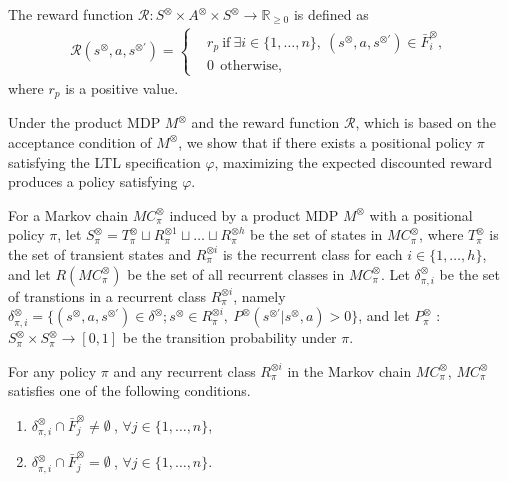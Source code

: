 \documentclass[a4j,12pt,oneside,openany,english,dvipdfmx]{jsbook}
\begin{document}
\begin{definition}
  The reward function $\mathcal{R} :S^{\otimes} \times A^{\otimes} \times S^{\otimes} \rightarrow {\mathbb R}_{\geq 0}$ is defined as
  \begin{align}
    \mathcal{R}(s^{\otimes}, a, s^{\otimes \prime}) =
    \left\{
    \begin{aligned}
      &r_p \  \text{if}\ \exists i \in \! \{ 1, \ldots ,n \},\ (s^{\otimes}, a, s^{\otimes \prime}) \in \bar{F}^{\otimes}_i \!,\\
      &0   \ \ \text{otherwise},
    \end{aligned}
    \right. \nonumber
  \end{align}
  where $r_p$ is a positive value.
\end{definition}

Under the product MDP $M^{\otimes}$ and the reward function $\mathcal{R}$, which is based on the acceptance condition of $ M^\otimes $, we show that if there exists a positional policy $\pi$ satisfying the LTL specification $\varphi$, maximizing the expected discounted reward produces a policy satisfying $\varphi$.

For a Markov chain $MC^{\otimes}_{\pi}$ induced by a product MDP $M^{\otimes}$ with a positional policy $\pi$, let $S^{\otimes}_{\pi}= T^{\otimes}_{\pi} \sqcup R^{\otimes 1}_{\pi} \sqcup \ldots \sqcup R^{\otimes h}_{\pi}$ be the set of states in $MC^{\otimes}_{\pi}$, where $T^{\otimes}_{\pi}$ is the set of transient states and $R^{\otimes i}_{\pi}$ is the recurrent class for each $i \in \{ 1, \ldots ,h \}$, and let $R(MC^{\otimes}_{\pi})$ be the set of all recurrent classes in $MC^{\otimes}_{\pi}$. Let $\delta^{\otimes}_{\pi,i}$ be the set of transtions in a recurrent class $R^{\otimes i}_{\pi}$, namely $\delta^{\otimes}_{\pi,i} = \{ (s^{\otimes},a,s^{\otimes \prime}) \in \delta^{\otimes} ; s^{\otimes} \in R^{\otimes i}_{\pi},\ P^{\otimes}(s^{\otimes \prime}|s^{\otimes},a) > 0 \}$, and let $P^{\otimes}_{\pi}$ : $S^{\otimes}_{\pi} \times S^{\otimes}_{\pi} \rightarrow [0,1]$ be the transition probability under $\pi$.

\begin{lemma}
  For any policy $\pi$ and any recurrent class $R^{\otimes i}_{\pi}$ in the Markov chain $MC^{\otimes}_{\pi}$,
  $MC^{\otimes}_{\pi}$ satisfies one of the following conditions.
  \vspace{2mm}
  \begin{enumerate}
    \item $\delta^{\otimes}_{\pi,i} \cap \bar{F}^{\otimes}_j \neq \emptyset\ $, $ \forall j \in \{ 1, \ldots ,n \}$,
    \item $\delta^{\otimes}_{\pi,i} \cap \bar{F}^{\otimes}_j = \emptyset\ $, $ \forall j \in \{ 1, \ldots ,n \}$.
  \end{enumerate}
  \label{lemma3-1}
\end{lemma}
\end{document}
